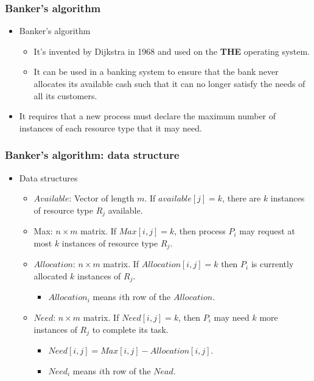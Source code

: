 \documentclass[CJKutf8,xcolor=pdftex,dvipsnames,table]{beamer}
\begin{document}
\begin{CJK*}{UTF8}{song}
  \begin{frame}
  \frametitle{Banker's algorithm} \pause
  \begin{itemize}
  \item{Banker's algorithm} \pause
    \begin{itemize}
    \item{It's invented by Dijkstra in 1968 and used on the \textbf{THE} operating system.} \pause
    \item{It can be used in a banking system to ensure that the bank never allocates its available cash such that it can no longer satisfy the needs of all its customers.} \pause
    \end{itemize}
  \item{It requires that a new process must declare the maximum number of instances of each resource type that it may need.}
  \end{itemize}
  \end{frame}
  
  \begin{frame}
  \frametitle{Banker's algorithm: data structure} \pause
  \begin{itemize}
  \item{Data structures} \pause
    \begin{itemize}
    \item{$Available$:  Vector of length $m$. If $available[j] = k$, there are $k$ instances of resource type $R_j$ available.} \pause
    \item{Max: $n \times m$ matrix.  If $Max[i,j] = k$, then process $P_i$ may request at most $k$ instances of resource type $R_j$.} \pause
    \item{$Allocation$:  $n \times m$ matrix.  If $Allocation[i,j] = k$ then $P_i$ is currently allocated $k$ instances of $R_j$.} \pause
      \begin{itemize}
      \item{$Allocation_i$ means $i$th row of the $Allocation$.} \pause
      \end{itemize}
    \item{$Need$:  $n \times m$ matrix. If $Need[i,j] = k$, then $P_i$ may need $k$ more instances of $R_j$ to complete its task.} \pause
      \begin{itemize}
      \item{$Need[i,j] = Max[i,j] - Allocation [i,j]$.} \pause
      \item{$Need_i$ means $i$th row of the $Nead$.}
      \end{itemize}
    \end{itemize}
  \end{itemize}
  \end{frame}
  

\end{CJK*}
\end{document}
